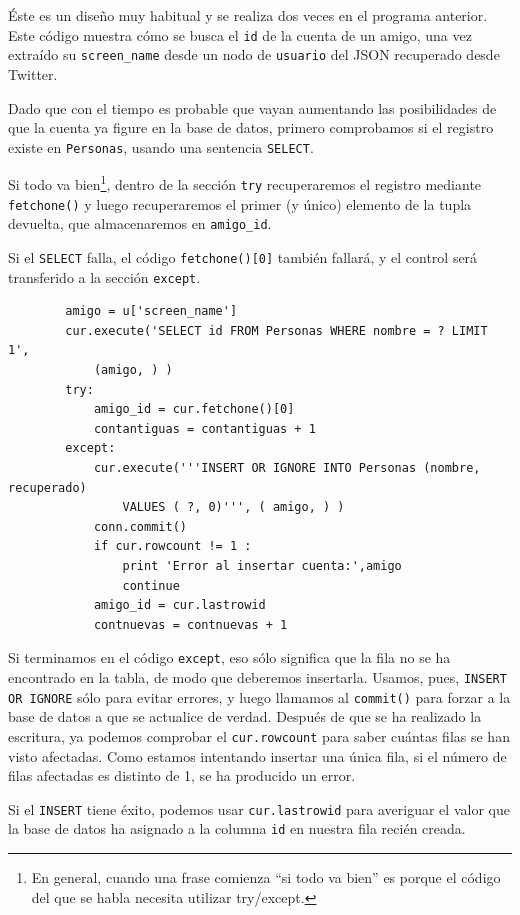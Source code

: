Éste es un diseño muy habitual y se realiza dos veces en el programa anterior.
Este código muestra cómo se busca el {\tt id} de la
cuenta de un amigo, una vez extraído su \verb"screen_name"
desde un nodo de {\tt usuario} del JSON recuperado desde Twitter.

Dado que con el tiempo es probable que vayan aumentando las posibilidades de que la cuenta
ya figure en la base de datos, primero comprobamos si el registro
existe en {\tt Personas}, usando una sentencia {\tt SELECT}.

Si todo va bien\footnote{En general, cuando una frase comienza
``si todo va bien''	es porque el código del que se habla necesita
utilizar try/except.}, dentro de la sección {\tt try} recuperaremos el
registro mediante {\tt fetchone()} y luego recuperaremos el
primer (y único) elemento de la tupla devuelta, que almacenaremos en
\verb"amigo_id".

Si el {\tt SELECT} falla, el código {\tt fetchone()[0]} también fallará,
y el control será transferido a la sección {\tt except}.

\beforeverb
\begin{verbatim}
        amigo = u['screen_name']
        cur.execute('SELECT id FROM Personas WHERE nombre = ? LIMIT 1',
            (amigo, ) )
        try:
            amigo_id = cur.fetchone()[0]
            contantiguas = contantiguas + 1
        except:
            cur.execute('''INSERT OR IGNORE INTO Personas (nombre, recuperado) 
                VALUES ( ?, 0)''', ( amigo, ) )
            conn.commit()
            if cur.rowcount != 1 :
                print 'Error al insertar cuenta:',amigo
                continue
            amigo_id = cur.lastrowid
            contnuevas = contnuevas + 1
\end{verbatim}
\afterverb
%
Si terminamos en el código {\tt except}, eso sólo significa que la fila
no se ha encontrado en la tabla, de modo que deberemos insertarla. Usamos, pues,
{\tt INSERT OR IGNORE} sólo para evitar errores, y luego llamamos al {\tt commit()} para
forzar a la base de datos a que se actualice de verdad. Después de que se ha realizado la escritura,
ya podemos comprobar el {\tt cur.rowcount} para saber cuántas filas se han visto afectadas. Como
estamos intentando insertar una única fila, si el número de
filas afectadas es distinto de 1, se ha producido un error.

Si el {\tt INSERT} tiene éxito, podemos usar {\tt cur.lastrowid}
para averiguar el valor que la base de datos ha asignado a la columna {\tt id}
en nuestra fila recién creada.

